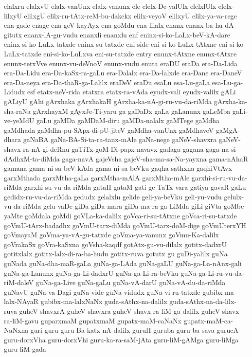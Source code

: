 {elalxru
elalxvU
elalx-vanUnx
elalx-vanunx
ele
elelx-De-yalUlx
elelxlUlx
elelx-lilxyU
elilxgU
elilx-ru-tAtx-reM-bu-dakekx
elilx-veyoV
elilxyU
elilx-ya-va-rege
ena-gade
enage
ena-geV-kayAyx
ena-goMdu
ena-lilalx
enanx
enanx-ba-hu-dA-gitutx
enanx-lA-gu-vudu
enanxli
enanxlu
enf
eninx-si-ko-LaLx-beV-kA-dare
eninx-si-ko-LuLx-tatxde
eninx-su-tatxde
eni-side
eni-si-ko-LuLx-tAtxne
eni-si-ko-LuLx-tatxde
eni-si-ko-LuLxva
eni-su-tatxde
entry
enunx-tAtxne
enunx-tAtxre
enunx-tetxVve
enunx-vu-deVnoV
enunx-vudu
enuta
eraDU
eraDa
era-Da-Lida
era-Da-Lidu
era-Da-kaSx-ra-gaLu
era-Dalalx
era-Da-lalxde
era-Dane
era-DaneV
era-Da-neya
era-Da-thaR-ga-Lalilx
eraDeV
eraDu
esaLu
esa-Lu-gaLa
esa-Lu-ga-Lidudx
esf
etatx-neV-rida
etatxra
etatx-ra-vAda
eyudx-vali
eyudx-valilx
gALi
gALiyU
gAhi
gArxhaka
gArxhakaH
gArxha-ka-nA-gi-ru-vu-da-riMda
gArxha-ka-sha-raNa
gArxhayxM
gAyxJe-Ti-yaru
ga
gaDaDx
gaLa
gaLanunx
gaLeMba
gaLi-ve-yeMdU
gaLu
gaMDa
gaMDaM-diru
gaMDa-nalalx
gaMTege
gaMdha
gaMdhada
gaMdha-pu-SApx-di-pU-jiteV
gaMdha-vanUnx
gaMdhaveV
gaMgA-dhara
gaNaBA
gaNa-BA-Si-ta-ra-tanx-mAle
gaNa-nege
gaNeV-shavxra
gaNeV-shavx-ra-nA-gi-deRnu
gaTiTx-goM-Di-papx-navavx
gadaga
gagana
gaga-na-si-dAdhxM-ta-diMda
gaga-navA
gajeVsha
gajeV-sha-ma-sa-Na-yayxna
gama-nAhaR
gamana
gama-ni-sa-beV-kAda
gama-ni-sa-beVku
gaqha-sathxna
gaqhiVtAvx
garxMthada
garxMtha-gaLa
garxMtha-mAlA
garxMtha-mAle
garxhi-si-ru-vu-da-riMda
garxhi-su-vu-da-riMda
gataH
gataM
gati-ge-TaTx-vara
gatiya
gavaR-gaLu
gedidx-ru-vu-da-riMda
gedudx
gelalxlu
gelide
geli-ya-beVku
geli-yu-vudu
gelulx-vu-da-riMda
gelu-vaDe
giDa
giDa-mara
giDa-ma-ra-ga-LiMda
giLi
giVta
goMbe-yaMte
goMdala
goMdi
goVLa-ka-dalilx
goVca-ri-su-tAtxne
goVca-ri-su-tatxde
goVmU-tArx-badadhx
goVmU-tarx-diMda
goVmU-tarx-doM-dige
goVmUterxYH
goVmayaM
goVma-ya-vA-gu-tatxde
goVma-ya-vanunx
goVmu-Ka-dalilx
goVrakaSx
goVra-kaSxna
goVsha-kaqdf
gotAtx-gu-vu-dilalx
gotitx-dadxrU
gotitxlalx
gotitx-lalx-di-ra-ba-hudu
gotitx-ruva
gotutx
gu
guDi-yalilx
guNa
guNada
guNa-dha-maR-gaLa
guNa-ga-LAda
guNa-gaLU
guNa-ga-La-nAnx-gali
guNa-ga-Lanunx
guNa-ga-Li-dadxrU
guNa-ga-Li-ra-beVku
guNa-ga-Li-ru-vu-da-riM-daleV
guNa-ga-Live
guNa-gaLu
guNa-vA-darU
guNa-vA-du-da-riMda
guNavU
guNa-va-Dagi
guNa-vide
guNa-vidudx
guNa-vi-ru-tatxde
gubibx-ma-lalx-NAyaR
gubibx-ma-lalxNaNx
guda-sAthx-na-dalilx
guda-sAthx-na-da-lilx-ruva
guheV-shavxrA
guheV-shavxra
guheV-shavx-ra-liM-ga-dalilx
guheV-shavx-ra-liM-gavu
guparxmaM
gupatxmaM
gupatx-maM-caNaNx
gupatx-maM-ca-NaNxna
guri
guru
guru-Ba-katx-nA-dalilx
guruH
guruba
guru-ba-sava
gurucA
guru-dorxVha
guru-dorxVhi
guru-ka-ra-saM-jAta
guru-liM-gAMga
guru-liMga
guru-liM-gada
}
